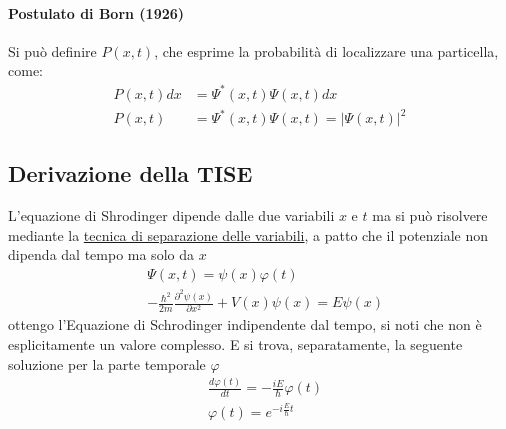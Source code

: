 \paragraph{Postulato di Born (1926)} Si può definire $P(x,t)$, che esprime la probabilità di localizzare una particella, come:
\begin{equation}
\begin{split}
P(x,t) dx & = \Psi^{\ast}(x,t)\Psi(x,t) dx \\
P(x,t) & = \Psi^{\ast}(x,t)\Psi(x,t) = |\Psi(x,t)|^2
\end{split}
\end{equation}


\subsection{Derivazione della TISE}
L'equazione di Shrodinger dipende dalle due variabili $x$ e $t$ ma si può risolvere mediante la \underline{tecnica di separazione delle variabili}, a patto che il potenziale non dipenda dal tempo ma solo da $x$
\begin{equation}
\begin{split}
& \Psi(x,t) = \psi(x)\varphi(t) \\
& -\frac{\hbar^2}{2m} \frac{\partial^2 \psi(x)}{\partial x^2}+ V(x)\psi(x) = E\psi(x)
\end{split}
\end{equation}
ottengo l'Equazione di Schrodinger indipendente dal tempo, si noti che non è esplicitamente un valore complesso.
E si trova, separatamente, la seguente soluzione per la parte temporale $\varphi$
\begin{equation}
\begin{split}
& \frac{d \varphi(t)}{dt} = - \frac{i E}{\hbar} \varphi(t) \\
& \varphi(t) = e^{-i \frac{E}{\hbar} t}
\label{eq_sch_temp}
\end{split}
\end{equation}

